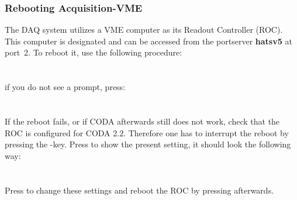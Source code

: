 {{\subsubsection{Rebooting Acquisition-VME \\ }

The DAQ system utilizes a VME computer as its Readout Controller (ROC). This
computer is designated  and can be
accessed from the portserver \textbf{hatsv5} at port~2. To reboot it, use the following 
procedure:\\
\\
\\
if you do not see a prompt, press: \\
\\
\mycomp{-$>$ reboot\\
-$>$ Ctrl $]$ \\
telnet$>$ q \\
epmeas@adaqep.jlab.org$>$\\} 
\\
If the reboot fails, or if CODA afterwards still does not work, 
check that the ROC is configured for CODA 2.2.
Therefore one has to interrupt the reboot by pressing the -key.
Press  to show the present setting, it should look the following
way:\\
\\
\\
Press  to change these settings and 
reboot the ROC by pressing  afterwards.

}}

